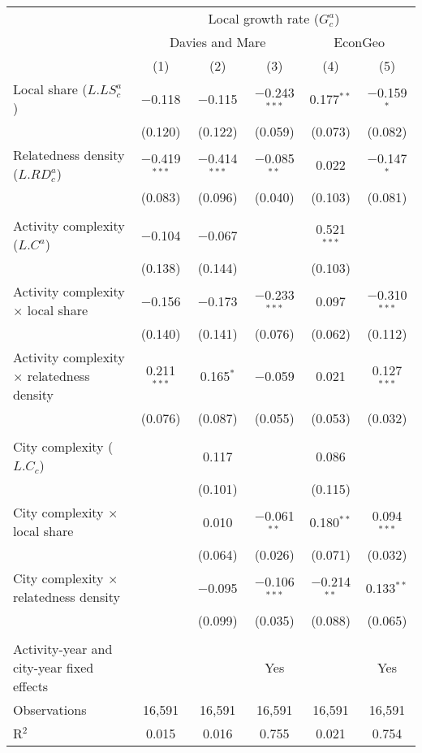 \begin{tabular}{lccccc}
\toprule
& \multicolumn{5}{c}{Local growth rate ($G_c^a$)} \\
\cmidrule(lr){2-6}
& \multicolumn{3}{c}{Davies and Mare} & \multicolumn{2}{c}{EconGeo} \\
\cmidrule(lr){2-4} \cmidrule(lr){5-6}
& (1) & (2) & (3) & (4) & (5)\\
\midrule
Local share ($L.LS_c^a$) & $-$0.118 & $-$0.115 & $-$0.243$^{***}$ & 0.177$^{**}$ & $-$0.159$^{*}$ \\
& (0.120) & (0.122) & (0.059) & (0.073) & (0.082) \\
Relatedness density ($L.RD_c^a$) & $-$0.419$^{***}$ & $-$0.414$^{***}$ & $-$0.085$^{**}$ & 0.022 & $-$0.147$^{*}$ \\
& (0.083) & (0.096) & (0.040) & (0.103) & (0.081) \\
\\
Activity complexity ($L.C^a$) & $-$0.104 & $-$0.067 &  & 0.521$^{***}$ &  \\
& (0.138) & (0.144) &  & (0.103) &  \\
Activity complexity $\times$ local share & $-$0.156 & $-$0.173 & $-$0.233$^{***}$ & 0.097 & $-$0.310$^{***}$ \\
& (0.140) & (0.141) & (0.076) & (0.062) & (0.112) \\
Activity complexity $\times$ relatedness density & 0.211$^{***}$ & 0.165$^{*}$ & $-$0.059 & 0.021 & 0.127$^{***}$ \\
& (0.076) & (0.087) & (0.055) & (0.053) & (0.032) \\
\\
City complexity ($L.C_c$) &  & 0.117 &  & 0.086 &  \\
&  & (0.101) &  & (0.115) &  \\
City complexity $\times$ local share &  & 0.010 & $-$0.061$^{**}$ & 0.180$^{**}$ & 0.094$^{***}$ \\
&  & (0.064) & (0.026) & (0.071) & (0.032) \\
City complexity $\times$ relatedness density &  & $-$0.095 & $-$0.106$^{***}$ & $-$0.214$^{**}$ & 0.133$^{**}$ \\
&  & (0.099) & (0.035) & (0.088) & (0.065) \\
\\
Activity-year and city-year fixed effects & & & Yes & & Yes \\
\midrule
Observations & 16,591 & 16,591 & 16,591 & 16,591 & 16,591 \\
R$^{2}$ & 0.015 & 0.016 & 0.755 & 0.021 & 0.754 \\
\bottomrule
\end{tabular}
